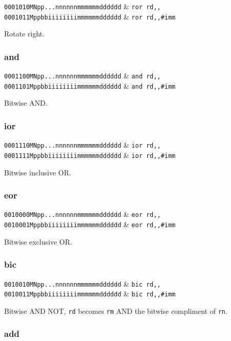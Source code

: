 \decfmt
\texttt{0001010MNpp...nnnnnnmmmmmmdddddd} & \texttt{ror rd,,}\\
\texttt{0001011Mppbbiiiiiiiimmmmmmdddddd} & \texttt{ror rd,,\#imm}
\finfmt

Rotate right.

\subsubsection{and}

\decfmt
\texttt{0001100MNpp...nnnnnnmmmmmmdddddd} & \texttt{and rd,,}\\
\texttt{0001101Mppbbiiiiiiiimmmmmmdddddd} & \texttt{and rd,,\#imm}
\finfmt

Bitwise AND.

\subsubsection{ior}

\decfmt
\texttt{0001110MNpp...nnnnnnmmmmmmdddddd} & \texttt{ior rd,,}\\
\texttt{0001111Mppbbiiiiiiiimmmmmmdddddd} & \texttt{ior rd,,\#imm}
\finfmt

Bitwise inclusive OR.

\subsubsection{eor}

\decfmt
\texttt{0010000MNpp...nnnnnnmmmmmmdddddd} & \texttt{eor rd,,} \\
\texttt{0010001Mppbbiiiiiiiimmmmmmdddddd} & \texttt{eor rd,,\#imm}
\finfmt

Bitwise exclusive OR.

\subsubsection{bic}

\decfmt
\texttt{0010010MNpp...nnnnnnmmmmmmdddddd} & \texttt{bic rd,,} \\
\texttt{0010011Mppbbiiiiiiiimmmmmmdddddd} & \texttt{bic rd,,\#imm}
\finfmt

Bitwise AND NOT, \texttt{rd} becomes \texttt{rm} AND the bitwise compliment of \texttt{rn}.

\subsubsection{add}

